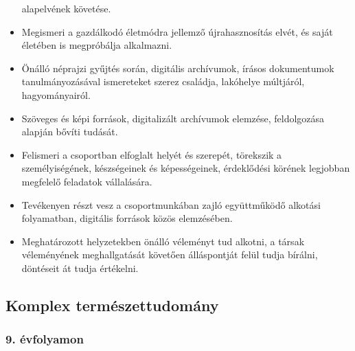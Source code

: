 \begin{itemize}
  alapelvének követése.
\item
  Megismeri a gazdálkodó életmódra jellemző újrahasznosítás elvét, és
  saját életében is megpróbálja alkalmazni.
\item
  Önálló néprajzi gyűjtés során, digitális archívumok, írásos
  dokumentumok tanulmányozásával ismereteket szerez családja, lakóhelye
  múltjáról, hagyományairól.
\item
  Szöveges és képi források, digitalizált archívumok elemzése,
  feldolgozása alapján bővíti tudását.
\item
  Felismeri a csoportban elfoglalt helyét és szerepét, törekszik a
  személyiségének, készségeinek és képességeinek, érdeklődési körének
  legjobban megfelelő feladatok vállalására.
\item
  Tevékenyen részt vesz a csoportmunkában zajló együttműködő alkotási
  folyamatban, digitális források közös elemzésében.
\item
  Meghatározott helyzetekben önálló véleményt tud alkotni, a társak
  véleményének meghallgatását követően álláspontját felül tudja bírálni,
  döntéseit át tudja értékelni.
\end{itemize}

\hypertarget{komplex-termeszettudomany}{%
\subsection{Komplex természettudomány}\label{komplex-termeszettudomany}}

\hypertarget{evfolyamon-19}{%
\subsubsection{9. évfolyamon}\label{evfolyamon-19}}

